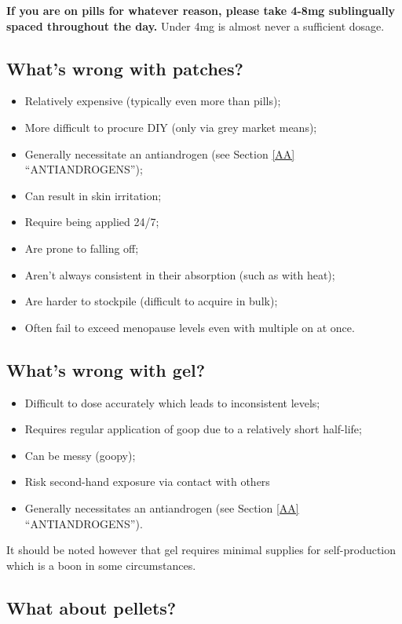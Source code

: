 \documentclass{article}
\begin{document}
\textbf{If you are on pills for whatever reason, please take 4-8mg sublingually spaced throughout the day.} Under 4mg is almost never a sufficient dosage.

\subsection{What’s wrong with patches?}

\begin{itemize}
  \item Relatively expensive (typically even more than pills);
  \item More difficult to procure DIY (only via grey market means);
  \item Generally necessitate an antiandrogen (see Section \ref{AA} “ANTIANDROGENS”);
  \item Can result in skin irritation;
  \item Require being applied 24/7;
  \item Are prone to falling off;
  \item Aren’t always consistent in their absorption (such as with heat);
  \item Are harder to stockpile (difficult to acquire in bulk);
  \item Often fail to exceed menopause levels even with multiple on at once.
\end{itemize}

\subsection{What’s wrong with gel?}

\begin{itemize}
  \item Difficult to dose accurately which leads to inconsistent levels;
  \item Requires regular application of goop due to a relatively short half-life;
  \item Can be messy (goopy);
  \item Risk second-hand exposure via contact with others
  \item Generally necessitates an antiandrogen (see Section \ref{AA} “ANTIANDROGENS”).
\end{itemize}

It should be noted however that gel requires minimal supplies for self-production which is a boon in some circumstances.

\subsection{What about pellets?}
\end{document}
